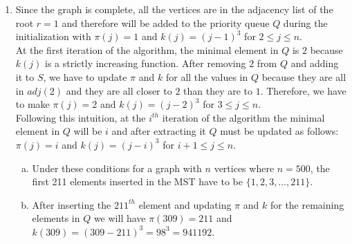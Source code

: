 \documentclass{article}
\begin{document}
\begin{enumerate}[1.]

    \item Since the graph is complete, all the vertices are in the adjacency list of the root $r = 1$ and therefore will be added to the priority queue $Q$ during the initialization with $\pi(j) = 1$ and $k(j) = (j - 1)^3$ for $2 \leq j \leq n$.\\
    At the first iteration of the algorithm, the minimal element in $Q$ is $2$ because $k(j)$ is a strictly increasing function\footnotemark. After removing $2$ from $Q$ and adding it to $S$, we have to update $\pi$ and $k$ for all the values in $Q$ because they are all in $adj(2)$ and they are all closer to $2$ than they are to $1$. Therefore, we have to make $\pi(j) = 2$ and $k(j) = (j - 2)^3$ for $3 \leq j \leq n$.\\
    Following this intuition, at the $i^{th}$ iteration of the algorithm the minimal element in $Q$ will be $i$ and after extracting it $Q$ must be updated as follows: $\pi(j) = i$ and $k(j) = (j - i)^3$ for $i + 1 \leq j \leq n$.
    \begin{enumerate}[(a)]
        \item Under these conditions for a graph with $n$ vertices where $n = 500$, the first 211 elements inserted in the MST have to be $\{1, 2, 3, \ldots , 211\}$.
        \item After inserting the $211^{th}$ element and updating $\pi$ and $k$ for the remaining elements in $Q$ we will have $\pi(309) = 211$ and $k(309) = (309 - 211)^3 = 98^3 = 941192$.
    \end{enumerate}
    

\end{enumerate}
\end{document}
